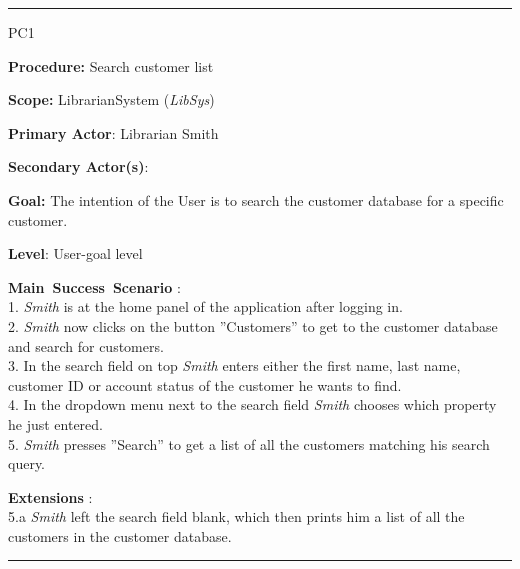 \vspace{0.5cm}
\hrule
\begin{lyxlist}{PC1}
\small{
\item [\textbf{Procedure:}] Search customer list
\item [\textbf{Scope:}] LibrarianSystem (\emph{LibSys})
\item [\textbf{Primary Actor}:] Librarian Smith
\item [\textbf{Secondary Actor(s)}:] 
\item [\textbf{Goal:}] The intention of the User is to search the customer
database for a specific customer.
\item [\textbf{Level}:] User-goal level
\item [\textbf{Main~Success~Scenario}]:\\
1. \emph{Smith} is at the home panel of the application after logging in.\\
2. \emph{Smith} now clicks on the button ''Customers'' to get to the customer
database and search for customers.\\
3. In the search field on top \emph{Smith} enters either the first name, last
name, customer ID or account status of the customer he wants to find.\\
4. In the dropdown menu next to the search field \emph{Smith} chooses which
property he just entered.\\
5. \emph{Smith} presses ''Search'' to get a list of all the customers matching
his search query.\\


\item [\textbf{Extensions}]:\\
5.a \emph{Smith} left the search field blank, which then prints him a list of
all the customers in the customer database.\\
}

\end{lyxlist}
\hrule


